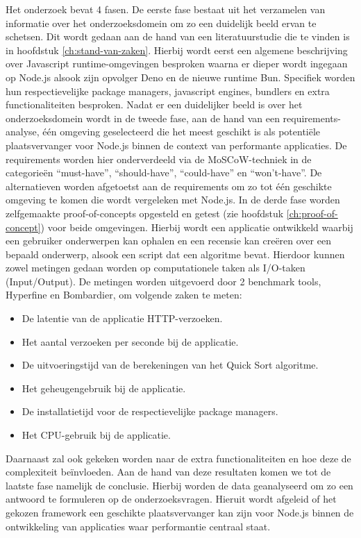 Het onderzoek bevat 4 fasen. 
De eerste fase bestaat uit het verzamelen van informatie over het onderzoeksdomein om zo een duidelijk beeld ervan te schetsen.
Dit wordt gedaan aan de hand van een literatuurstudie die te vinden is in hoofdstuk \ref{ch:stand-van-zaken}. 
Hierbij wordt eerst een algemene beschrijving over Javascript runtime-omgevingen besproken waarna 
er dieper wordt ingegaan op Node.js alsook zijn opvolger Deno en de nieuwe runtime Bun. 
Specifiek worden hun respectievelijke package managers, javascript engines, bundlers en extra functionaliteiten besproken.
Nadat er een duidelijker beeld is over het onderzoeksdomein wordt in de tweede fase, aan de hand van een requirements-analyse, 
één omgeving geselecteerd die het meest geschikt is als potentiële plaatsvervanger voor Node.js binnen de context van performante applicaties.
De requirements worden hier onderverdeeld via de MoSCoW-techniek in de categorieën “must-have”, “should-have”, “could-have” en “won't-have”. 
De alternatieven worden afgetoetst aan de requirements om zo tot één geschikte omgeving te komen die wordt vergeleken met Node.js.
In de derde fase worden zelfgemaakte proof-of-concepts opgesteld en getest (zie hoofdstuk \ref{ch:proof-of-concept}) voor beide omgevingen. 
Hierbij wordt een applicatie ontwikkeld waarbij een gebruiker onderwerpen kan ophalen en 
een recensie kan creëren over een bepaald onderwerp,
alsook een script dat een algoritme bevat. Hierdoor kunnen zowel metingen gedaan worden op computationele taken als I/O-taken (Input/Output).
De metingen worden uitgevoerd door 2 benchmark tools, Hyperfine en Bombardier, om volgende zaken te meten:
\begin{itemize}
    \item De latentie van de applicatie HTTP-verzoeken.
    \item Het aantal verzoeken per seconde bij de applicatie.
    \item De uitvoeringstijd van de berekeningen van het Quick Sort algoritme.
    \item Het geheugengebruik bij de applicatie.
    \item De installatietijd voor de respectievelijke package managers.
    \item Het CPU-gebruik bij de applicatie.
\end{itemize}
Daarnaast zal ook gekeken worden naar de extra functionaliteiten en hoe deze de complexiteit beïnvloeden.
Aan de hand van deze resultaten komen we tot de laatste fase namelijk de conclusie. 
Hierbij worden de data geanalyseerd om zo een antwoord te formuleren op de onderzoeksvragen.
Hieruit wordt afgeleid of het gekozen framework een geschikte plaatsvervanger kan zijn voor Node.js binnen 
de ontwikkeling van applicaties waar performantie centraal staat.
